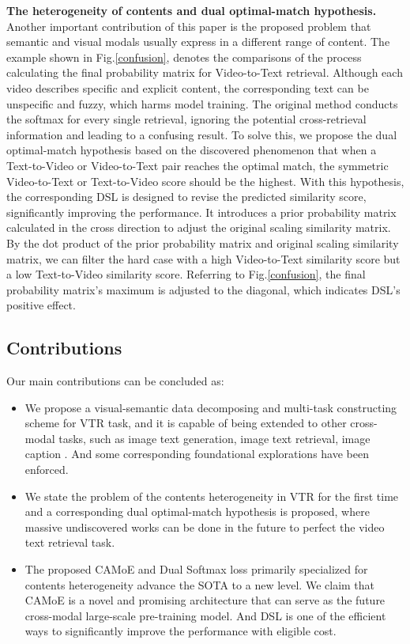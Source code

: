 \documentclass[letterpaper]{article} \usepackage{aaai22}  \usepackage{times}  \usepackage{helvet}  \usepackage{courier}  \usepackage[hyphens]{url}  \usepackage{graphicx} \urlstyle{rm} \def\UrlFont{\rm}  \usepackage{natbib}  \usepackage{caption}
\begin{document}
\textbf{The heterogeneity of contents and dual optimal-match hypothesis.} Another important contribution of this paper is the proposed problem that semantic and visual modals usually express in a different range of content. The example shown in Fig.\ref{confusion}, denotes the comparisons of the process calculating the final probability matrix for Video-to-Text retrieval. Although each video describes specific and explicit content, the corresponding text can be unspecific and fuzzy, which harms model training. The original method conducts the softmax for every single retrieval, ignoring the potential cross-retrieval information and leading to a confusing result. To solve this, we propose the dual optimal-match hypothesis based on the discovered phenomenon that when a Text-to-Video or Video-to-Text pair reaches the optimal match, the symmetric Video-to-Text or Text-to-Video score should be the highest. With this hypothesis, the corresponding 
DSL is designed to revise the predicted similarity score, significantly improving the performance. It introduces a prior probability matrix calculated in the cross direction to adjust the original scaling similarity matrix. By the dot product of the prior probability matrix and 
original scaling similarity matrix, we can filter the hard case with a high Video-to-Text similarity score but a low Text-to-Video similarity score. Referring to Fig.\ref{confusion}, the final probability matrix's maximum is adjusted to the diagonal, which indicates DSL's positive effect.

\subsection{Contributions}
Our main contributions can be concluded as:
\begin{itemize}
    \item We propose a visual-semantic data decomposing and multi-task constructing scheme for VTR task, and it is capable of being extended to other cross-modal tasks, such as image text generation, image text retrieval, image caption \cite{ding2021cogview,li2020oscar,zhang2021vinvl}. And some corresponding foundational explorations have been enforced.
    \item We state the problem of the contents heterogeneity in VTR for the first time and a corresponding dual optimal-match hypothesis is proposed, where massive undiscovered works can be done in the future to perfect the video text retrieval task. 
    \item The proposed CAMoE and Dual Softmax loss primarily specialized for contents heterogeneity advance the SOTA to a new level. We claim that CAMoE is a novel and promising architecture that can serve as the future cross-modal large-scale pre-training model. And DSL is one of the efficient ways to significantly improve the performance with eligible cost.
\end{itemize}
\end{document}
